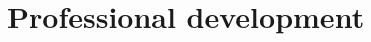 \documentclass[letterpaper]{deedy-resume} %
\begin{document}

  





  
  



\vspace{0.2cm}
\section{Professional development}
\vspace{0.2cm}
\end{document}

